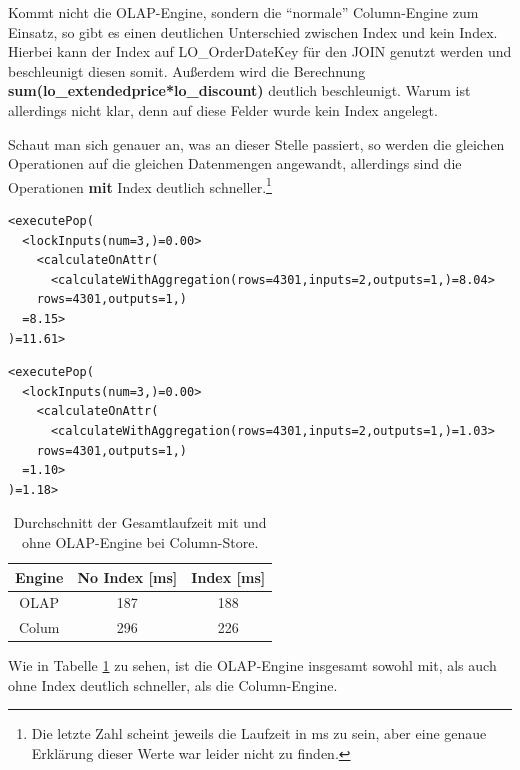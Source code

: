 Kommt nicht die OLAP-Engine, sondern die \enquote{normale} Column-Engine zum Einsatz, so gibt es einen deutlichen Unterschied zwischen Index und kein Index. Hierbei kann der Index auf LO\_OrderDateKey für den JOIN genutzt werden und beschleunigt diesen somit.
Außerdem wird die Berechnung \textbf{sum(lo\_extendedprice*lo\_discount)} deutlich beschleunigt. Warum ist allerdings nicht klar, denn auf diese Felder wurde kein Index angelegt.


Schaut man sich genauer an, was an dieser Stelle passiert, so werden die gleichen Operationen auf die gleichen Datenmengen angewandt, allerdings sind die Operationen \textbf{mit} Index deutlich schneller.\footnote{Die letzte Zahl scheint jeweils die Laufzeit in ms zu sein, aber eine genaue Erklärung dieser Werte war leider nicht zu finden.}
\begin{lstlisting}[breaklines, caption=Ohne Index]
<executePop(
  <lockInputs(num=3,)=0.00>
    <calculateOnAttr(
      <calculateWithAggregation(rows=4301,inputs=2,outputs=1,)=8.04>
    rows=4301,outputs=1,)
  =8.15>
)=11.61>
\end{lstlisting}

\begin{lstlisting}[breaklines, caption=Mit Index]
<executePop(
  <lockInputs(num=3,)=0.00>
    <calculateOnAttr(
      <calculateWithAggregation(rows=4301,inputs=2,outputs=1,)=1.03>
    rows=4301,outputs=1,)
  =1.10>
)=1.18>
\end{lstlisting}

\begin{table}
    \begin{tabular}{ccc}
        \toprule
        Engine              & No Index [ms]   & Index [ms] \\
        \toprule
        OLAP                & 187        & 188            \\
        Colum               & 296        & 226            \\   
        \bottomrule
    \end{tabular}
	\caption{Durchschnitt der Gesamtlaufzeit mit und ohne OLAP-Engine bei Column-Store.}
    \label{tab:olap}
\end{table}



Wie in Tabelle \ref{tab:olap} zu sehen, ist die OLAP-Engine insgesamt sowohl mit, als auch ohne Index deutlich schneller, als die Column-Engine. 

